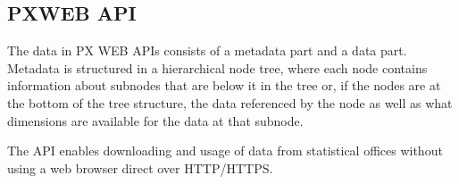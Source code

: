\subsection*{PXWEB API}
The data in PX WEB APIs consists of a metadata part and a data part. Metadata is structured in a hierarchical node tree, where each node contains information about subnodes that are below it in the tree or, if the nodes are at the bottom of the tree structure, the data referenced by the node as well as what dimensions are available for the data at that subnode.
 
The API enables downloading and usage of data from statistical offices without using a web browser direct over HTTP/HTTPS.




